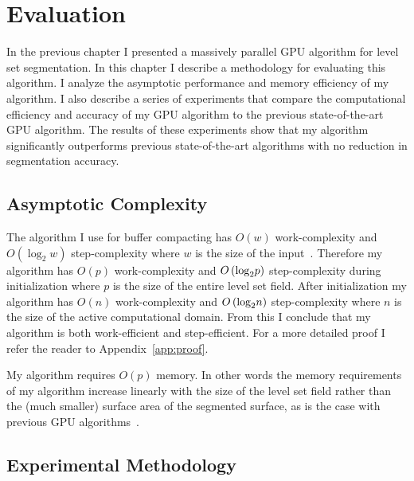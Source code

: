 \fancyhead[RO,LE]{\thepage}
\fancyfoot{} 
\chapter{Evaluation}
\label{chapter:evaluation}

In the previous chapter I presented a massively parallel GPU algorithm for level set segmentation. In this chapter I describe a methodology for evaluating this algorithm. I analyze the asymptotic performance and memory efficiency of my algorithm. I also describe a series of experiments that compare the computational efficiency and accuracy of my GPU algorithm to the previous state-of-the-art GPU algorithm.
The results of these experiments show that my algorithm significantly outperforms previous state-of-the-art algorithms with no reduction in segmentation accuracy.%
\section{Asymptotic Complexity}
\label{subsec:asymptoticComplexity}

The algorithm I use for buffer compacting has $O(w)$ work-complexity and $O({\log }_{2}w)$ step-complexity where $w$ is the size of the input~\cite{Sengupta-2011}. Therefore my algorithm has $O(p)$ work-complexity and $ O \left( { \log }_2 p \right) $ step-complexity during initialization where $p$ is the size of the entire level set field. After initialization my algorithm has $O(n)$ work-complexity and $ O \left( { \log }_2 n \right) $ step-complexity where $n$ is the size of the active computational domain. From this I conclude that my algorithm is both work-efficient and step-efficient. For a more detailed proof I refer the reader to Appendix~\ref{app:proof}.

My algorithm requires $O(p)$ memory. In other words the memory requirements of my algorithm increase linearly with the size of the level set field rather than the (much smaller) surface area of the segmented surface, as is the case with previous GPU algorithms~\cite{Lefohn-2003-MICCAI,Lefohn-2003-Vis,Cates-2004,Lefohn-2004,Jeong-2009}.

\section{Experimental Methodology}
\label{subsec:experimentalMethodology}


